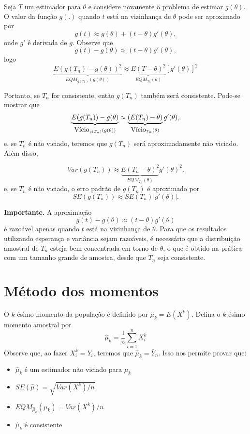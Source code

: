 \documentclass[
  letterpaper,
  DIV=11,
  numbers=noendperiod]{scrartcl}
\providecommand{\tightlist}{%
  \setlength{\itemsep}{0pt}\setlength{\parskip}{0pt}}\usepackage{longtable,booktabs,array}
\begin{document}
Seja \(T\) um estimador para \(\theta\) e considere novamente o problema
de estimar \(g(\theta)\). O valor da função \(g(.)\) quando \(t\) está
na vizinhança de \(\theta\) pode ser aproximado por
\[g(t)\approx g(\theta)+(t-\theta)g'(\theta),\] onde \(g'\) é derivada
de \(g\). Observe que \[g(t)-g(\theta)\approx (t-\theta)g'(\theta),\]
logo
\[\underbrace{E\left(g(T_n)-g(\theta)\right)^2}_{EQM_{g(T_n)}(g(\theta))}\approx \underbrace{E\left(T-\theta\right)^2}_{EQM_{T_n}(\theta)} [g'(\theta)]^2\]

Portanto, se \(T_n\) for consistente, então \(g(T_n)\) também será
consistente. Pode-se mostrar que\\
\[\underbrace{E(g(T_n))-g(\theta)}_{\hbox{Vício}_{g(T_n)}(g(\theta))}\approx \underbrace{(E(T_n )-\theta)}_{\hbox{Vício}_{T_n}(\theta)}g'(\theta),\]
e, se \(T_n\) é não viciado, teremos que \(g(T_n)\) será aproximadamente
não viciado. Além disso,

\[Var(g(T_n))\approx \underbrace{E(T_n-\theta)^2}_{EQM_{T_n}(\theta)}g'(\theta)^2.\]
e, se \(T_n\) é não viciado, o erro padrão de \(g(T_n)\) é aproximado
por \[SE(g(T_n))\approx SE(T_n)|g'(\theta)|.\]

\textbf{Importante.} A aproximação
\[g(t)-g(\theta)\approx (t-\theta)g'(\theta)\] é razoável apenas quando
\(t\) está na vizinhança de \(\theta\). Para que os resultados
utilizando esperança e variância sejam razoáveis, é necessário que a
distribuição amostral de \(T_n\) esteja bem concentrada em torno de
\(\theta\), o que é obtido na prática com um tamanho grande de amostra,
desde que \(T_n\) seja consistente.

\section{Método dos momentos}\label{muxe9todo-dos-momentos}

O \(k\)-ésimo momento da população é definido por \(\mu_k=E(X^k)\).
Defina o \(k\)-ésimo momento amostral por
\[\hat{\mu}_k=\frac{1}{n}\sum_{i=1}^n X_i^k\] Observe que, ao fazer
\(X_i^k=Y_i\), teremos que \(\hat{\mu}_k=\bar{Y}_n\). Isso nos permite
provar que:

\begin{itemize}
\tightlist
\item
  \(\hat{\mu}_k\) é um estimador não viciado para \(\mu_k\)
\item
  \(SE(\hat{\mu})=\sqrt{Var(X^k)/n}\)
\item
  \(EQM_{\hat{\mu}_k}(\mu_k)=Var(X^k)/n\)
\item
  \(\hat{\mu}_k\) é consistente
\end{itemize}
\end{document}
